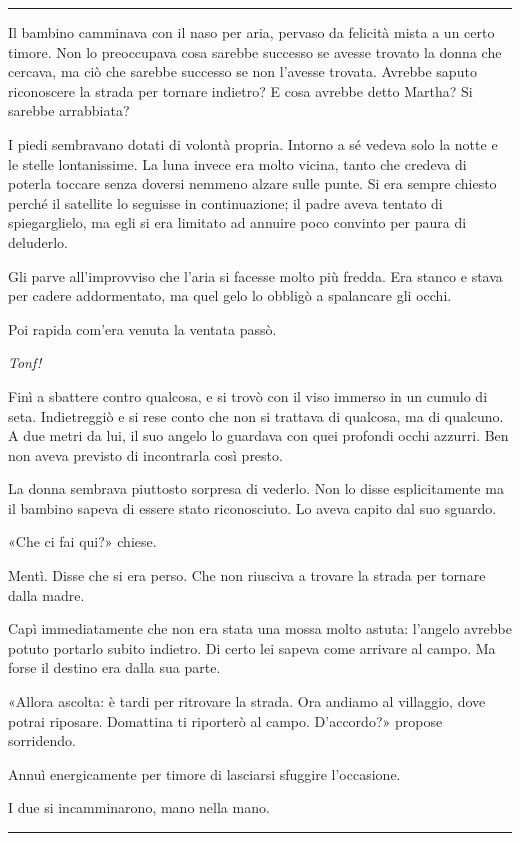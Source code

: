 \documentclass[a4paper,11pt,oneside,openright,final]{memoir}
\begin{document}
\plainbreak{1}

Il bambino camminava con il naso per aria, pervaso da felicità mista a un certo
timore. Non lo preoccupava cosa sarebbe successo se avesse trovato la donna che
cercava, ma ciò che sarebbe successo se non l'avesse trovata. Avrebbe saputo
riconoscere la strada per tornare indietro? E cosa avrebbe detto Martha? Si
sarebbe arrabbiata?

I piedi sembravano dotati di volontà propria. Intorno a sé vedeva solo la
notte e le stelle lontanissime. La luna invece era molto vicina, tanto che
credeva di poterla toccare senza doversi nemmeno alzare sulle punte. Si era
sempre chiesto perché il satellite lo seguisse in continuazione; il padre aveva
tentato di spiegarglielo, ma egli si era limitato ad annuire poco convinto per
paura di deluderlo.

Gli parve all'improvviso che l'aria si facesse molto più fredda. Era stanco e
stava per cadere addormentato, ma quel gelo lo obbligò a spalancare gli occhi.

Poi rapida com'era venuta la ventata passò.

\emph{Tonf!}

Finì a sbattere contro qualcosa, e si trovò con il viso immerso in un cumulo
di seta. Indietreggiò e si rese conto che non si trattava di qualcosa, ma di
qualcuno. A due metri da lui, il suo angelo lo guardava con quei profondi occhi
azzurri. Ben non aveva previsto di incontrarla così presto.

La donna sembrava piuttosto sorpresa di vederlo. Non lo disse esplicitamente ma
il bambino sapeva di essere stato riconosciuto. Lo aveva capito dal suo sguardo.

«Che ci fai qui?» chiese.

Mentì. Disse che si era perso. Che non riusciva a trovare la strada per tornare
dalla madre.

Capì immediatamente che non era stata una mossa molto astuta: l'angelo avrebbe
potuto portarlo subito indietro. Di certo lei sapeva come arrivare al campo. Ma
forse il destino era dalla sua parte.

«Allora ascolta: è tardi per ritrovare la strada. Ora andiamo al villaggio,
dove potrai riposare. Domattina ti riporterò al campo. D'accordo?» propose
sorridendo.

Annuì energicamente per timore di lasciarsi sfuggire l'occasione.

I due si incamminarono, mano nella mano.

\plainbreak{1}
\end{document}
